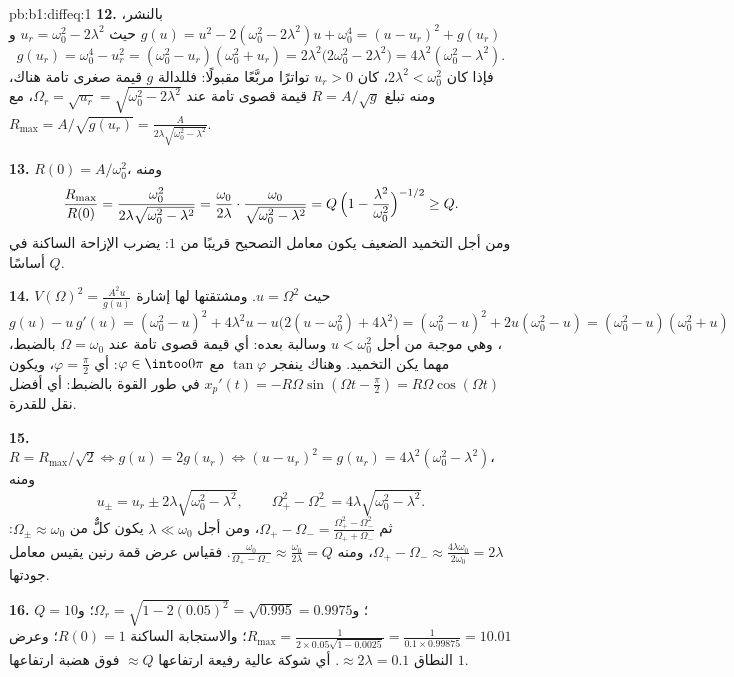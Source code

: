 \begin{solution}{pb:b1:diffeq:1}
\textbf{12.} بالنشر، $g(u) = u^2 - 2(\omega_0^2 - 2\lambda^2)u
+ \omega_0^4 = (u - u_r)^2 + g(u_r)$ حيث $u_r = \omega_0^2 -
2\lambda^2$ و
\[
g(u_r) = \omega_0^4 - u_r^2 = (\omega_0^2 - u_r)(\omega_0^2 +
u_r) = 2\lambda^2\bigl(2\omega_0^2 - 2\lambda^2\bigr) =
4\lambda^2(\omega_0^2 - \lambda^2) .
\]
فإذا كان $2\lambda^2 < \omega_0^2$، كان $u_r > 0$ تواترًا مربَّعًا
مقبولًا: فللدالة $g$ قيمة صغرى تامة هناك، ومنه تبلغ $R = A/\sqrt
g$ قيمة قصوى تامة عند $\Omega_r = \sqrt{u_r} =
\sqrt{\omega_0^2 - 2\lambda^2}$، مع $R_{\max} = A/\sqrt{g(u_r)}
= \frac{A}{2\lambda\sqrt{\omega_0^2 - \lambda^2}}$.

\textbf{13.} $R(0) = A/\omega_0^2$، ومنه
\[
\frac{R_{\max}}{R(0)}
= \frac{\omega_0^2}{2\lambda\sqrt{\omega_0^2 - \lambda^2}}
= \frac{\omega_0}{2\lambda}\cdot
\frac{\omega_0}{\sqrt{\omega_0^2 - \lambda^2}}
= Q\,\Bigl(1 - \frac{\lambda^2}{\omega_0^2}\Bigr)^{-1/2}
\geq Q .
\]
ومن أجل التخميد الضعيف يكون معامل التصحيح قريبًا من $1$: 
يضرب الإزاحة الساكنة في $Q$ أساسًا.

\textbf{14.} $V(\Omega)^2 = \frac{A^2 u}{g(u)}$ حيث $u =
\Omega^2$. ومشتقتها لها إشارة $g(u) - u\,g'(u) =
(\omega_0^2 - u)^2 + 4\lambda^2 u - u\bigl(2(u - \omega_0^2) +
4\lambda^2\bigr) = (\omega_0^2 - u)^2 + 2u(\omega_0^2 - u) =
(\omega_0^2 - u)(\omega_0^2 + u)$، وهي موجبة من أجل $u < \omega_0^2$
وسالبة بعده: أي قيمة قصوى تامة عند $\Omega =
\omega_0$ بالضبط، مهما يكن التخميد. وهناك ينفجر $\tan\varphi$ مع
$\varphi \in \intoo0\pi$: أي $\varphi = \frac\pi2$، ويكون $x_p'(t) =
-R\Omega\sin(\Omega t - \frac\pi2) = R\Omega\cos(\Omega t)$
في طور القوة بالضبط: أي أفضل نقل للقدرة.

\textbf{15.} $R = R_{\max}/\sqrt2 \iff g(u) = 2g(u_r) \iff (u -
u_r)^2 = g(u_r) = 4\lambda^2(\omega_0^2 - \lambda^2)$، ومنه
\[
u_\pm = u_r \pm 2\lambda\sqrt{\omega_0^2 - \lambda^2},
\qquad
\Omega_+^2 - \Omega_-^2 = 4\lambda\sqrt{\omega_0^2 - \lambda^2} .
\]
ثم $\Omega_+ - \Omega_- = \frac{\Omega_+^2 -
\Omega_-^2}{\Omega_+ + \Omega_-}$، ومن أجل $\lambda \ll \omega_0$
يكون كلٌّ من $\Omega_\pm \approx \omega_0$: $\Omega_+ - \Omega_- \approx
\frac{4\lambda\omega_0}{2\omega_0} = 2\lambda$، ومنه
$\frac{\omega_0}{\Omega_+ - \Omega_-} \approx
\frac{\omega_0}{2\lambda} = Q$. فقياس عرض قمة رنين
يقيس معامل جودتها.

\textbf{16.} $Q = 10$؛ و$\Omega_r = \sqrt{1 - 2(0.05)^2} =
\sqrt{0.995} = 0.9975$؛ و$R_{\max} = \frac1{2 \times 0.05
\sqrt{1 - 0.0025}} = \frac1{0.1 \times 0.99875} = 10.01$؛ والاستجابة
الساكنة $R(0) = 1$؛ وعرض النطاق $\approx 2\lambda = 0.1$. أي شوكة
عالية رفيعة ارتفاعها $\approx Q$ فوق هضبة ارتفاعها $1$.


\end{solution}

